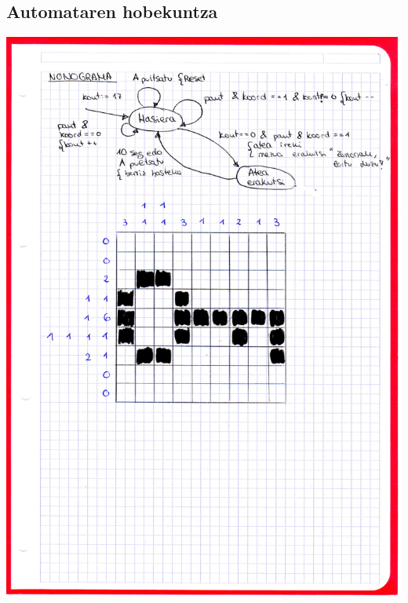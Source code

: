 \documentclass[dvipsnames]{AritzhClass}
\begin{document}
\subsection{Automataren hobekuntza}
\begin{center}
\includegraphics[scale=0.4]{img003}
\end{center}
\end{document}

